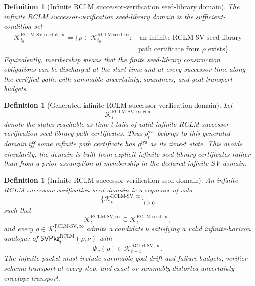 \documentclass[11pt,a4paper]{article}
\newtheorem{definition}[theorem]{Definition}
\newcommand{\Kcal}{\mathcal K}
\newcommand{\RCLM}{\mathrm{RCLM}}
\newcommand{\sys}{\mathrm{sys}}
\begin{document}
\begin{definition}[Infinite RCLM successor-verification seed-library domain]
\label{def:rclm-batch12b-infinite-sv-seed-library-domain}
The infinite RCLM successor-verification seed-library domain is the sufficient-condition set
\[
\begin{aligned}
\Kcal_{t_0}^{\RCLM\text{-}\mathrm{SV\mbox{-}seedlib},\infty}
=
\{\rho\in\Kcal_{t_0}^{\RCLM\text{-}\mathrm{seed},\infty}:{}&\
\text{an infinite RCLM SV seed-library}\\
&\text{path certificate from }\rho\text{ exists}\}.
\end{aligned}
\]
Equivalently, membership means that the finite seed-library construction obligations can be discharged at the start time and at every successor time along the certified path, with summable uncertainty, soundness, and goal-transport budgets.
\end{definition}

\begin{definition}[Generated infinite RCLM successor-verification domain]
\label{def:rclm-batch12b-generated-infinite-sv-domain}
Let
\[
\Kcal_t^{\RCLM\text{-}\mathrm{SV},\infty,\mathrm{gen}}
\]
denote the states reachable as time-\(t\) tails of valid infinite RCLM successor-verification seed-library path certificates. Thus \(\rho_t^{\sys}\) belongs to this generated domain iff some infinite path certificate has \(\rho_t^{\sys}\) as its time-\(t\) state. This avoids circularity: the domain is built from explicit infinite seed-library certificates rather than from a prior assumption of membership in the declared infinite SV domain.
\end{definition}

\begin{definition}[Infinite RCLM successor-verification seed domain]
\label{def:rclm-batch12b-infinite-sv-seed-domain}
An infinite RCLM successor-verification seed domain is a sequence of sets
\[
\{\Kcal_t^{\RCLM\text{-}\mathrm{SV},\infty}\}_{t\ge0}
\]
such that
\[
\Kcal_t^{\RCLM\text{-}\mathrm{SV},\infty}
\subseteq
\Kcal_t^{\RCLM\text{-}\mathrm{seed},\infty},
\]
and every \(\rho\in\Kcal_t^{\RCLM\text{-}\mathrm{SV},\infty}\) admits a candidate \(\nu\) satisfying a valid infinite-horizon analogue of \(\mathsf{SVPkg}_t^{\RCLM}(\rho,\nu)\) with
\[
\Phi_\nu(\rho)\in\Kcal_{t+1}^{\RCLM\text{-}\mathrm{SV},\infty}.
\]
The infinite packet must include summable goal-drift and failure budgets, verifier-schema transport at every step, and exact or summably distorted uncertainty-envelope transport.
\end{definition}
\end{document}
